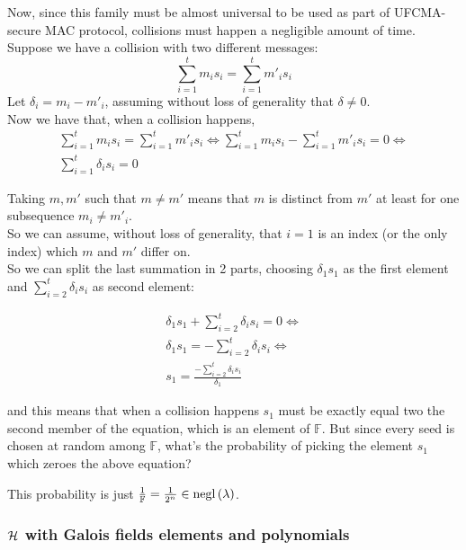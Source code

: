  Now, since this family must be almost universal to be used as part of
 UFCMA-secure MAC protocol, collisions must happen a negligible amount of
 time.\\
 Suppose we have a collision with two different messages:
\[
     \sum_{i=1}^{t} m_{i}s_{i}=\sum_{i=1}^{t} m'_{i}s_{i}
\]
 Let $\delta_{i}=m_{i}-m'_{i}$, assuming  without loss of generality that
 $\delta \not= 0$.\\
 Now we have that, when a collision happens, 
 \begin{gather*}
     \sum_{i=1}^{t} m_{i}s_{i}=\sum_{i=1}^{t} m'_{i}s_{i}\Leftrightarrow 
     \sum_{i=1}^{t} m_{i}s_{i}-\sum_{i=1}^{t} m'_{i}s_{i}=0 \Leftrightarrow \\
     \sum_{i=1}^{t} \delta_{i}s_{i}=0 
 \end{gather*}

 Taking $m, m'$ such that $m \not= m'$ means that $m$ is distinct from $m'$
 at least for one subsequence $m_{i}\not=m'_{i}$.\\
 So we can assume, without loss of generality, that $i=1$ is an index (or the
 only index) which $m$ and $m'$ differ on.\\

 So we can split the last summation in 2 parts, choosing $\delta_{1}s_{1}$ as the first element and $ \sum_{i=2}^{t} \delta_{i}s_{i}$ as second element:

 \begin{gather*}
         \delta_{1}s_{1}+\sum_{i=2}^{t} \delta_{i}s_{i}=0 \Leftrightarrow \\
         \delta_{1}s_{1}=-\sum_{i=2}^{t} \delta_{i}s_{i} \Leftrightarrow \\
         s_{1}=\frac{-\sum_{i=2}^{t} \delta_{i}s_{i}}{\delta_{1}}
     \end{gather*}

     and this means that when a collision happens $s_{1}$ must be exactly equal two the second member of the equation, which is an element of $\mathbb{F}$. But since every seed is chosen at random among $ \mathbb{F} $, what's the probability of picking the element $s_{1}$ which zeroes the above equation?

     This probability is just $\frac{1}{ \mathbb{F} } = \frac{1}{2^{n}} \in
     \mathrm{negl}\left({\lambda}\right) $.

     \subsubsection{$\mathcal{H}$ with Galois fields elements and polynomials}

